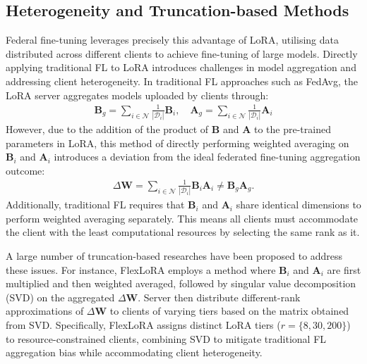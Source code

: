 \documentclass{article}
\begin{document}
\subsection{Heterogeneity and Truncation-based Methods}
Federal fine-tuning leverages precisely this advantage of LoRA, utilising data distributed across different clients to achieve fine-tuning of large models. Directly applying traditional FL to LoRA introduces challenges in model aggregation and addressing client heterogeneity. In traditional FL approaches such as FedAvg, the LoRA server aggregates models uploaded by clients through:
\begin{align}
    \mathbf{B}_{g} = \sum_{i \in \mathcal{N}}{\frac{1}{|\mathcal{D}_{i}|} \mathbf{B}_{i}},\quad 
    \mathbf{A}_{g} = \sum_{i \in \mathcal{N}}{\frac{1}{|\mathcal{D}_{i}|} \mathbf{A}_{i}}
\end{align}
However, due to the addition of the product of $\mathbf{B}$ and $\mathbf{A}$ to the pre-trained parameters in LoRA, this method of directly performing weighted averaging on $\mathbf{B}_{i}$ and $\mathbf{A}_{i}$ introduces a deviation from the ideal federated fine-tuning aggregation outcome:
\begin{align}
    \Delta \mathbf{W} = \sum_{i \in \mathcal{N}}{\frac{1}{|\mathcal{D}_{i}|} \mathbf{B}_{i}\mathbf{A}_{i}} \neq \mathbf{B}_{g}\mathbf{A}_{g}.
\end{align}
Additionally, traditional FL requires that $\mathbf{B}_{i}$ and $\mathbf{A}_{i}$ share identical dimensions to perform weighted averaging separately. This means all clients must accommodate the client with the least computational resources by selecting the same rank as it.

A large number of truncation-based researches have been proposed to address these issues. For instance, FlexLoRA employs a method where $\mathbf{B}_{i}$ and $\mathbf{A}_{i}$ are first multiplied and then weighted averaged, followed by singular value decomposition (SVD) on the aggregated $\Delta \mathbf{W}$. Server then distribute different-rank approximations of $\Delta \mathbf{W}$ to clients of varying tiers based on the matrix obtained from SVD. Specifically, FlexLoRA assigns distinct LoRA tiers ($r=\{8, 30, 200\}$) to resource-constrained clients, combining SVD to mitigate traditional FL aggregation bias while accommodating client heterogeneity.
\end{document}
